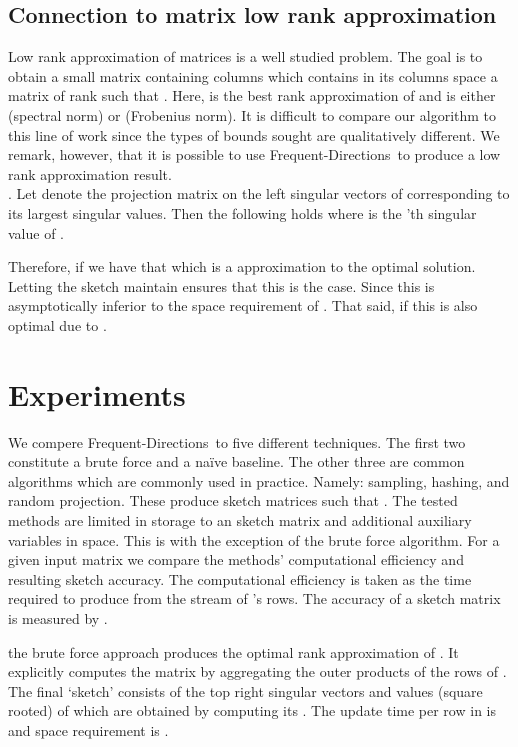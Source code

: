 \documentclass[]{article}
\newcommand{\FD}{Frequent-Directions}
\begin{document}
\subsection{Connection to matrix low rank approximation}
Low rank approximation of matrices is a well studied problem.
The goal is to obtain a small matrix  containing  columns 
which contains in its columns space a matrix  of rank  such that .
Here,  is the best rank  approximation of  and  is either  (spectral norm) or  (Frobenius norm). 
It is difficult to compare our algorithm to this line of work since the types of bounds sought are qualitatively different.
We remark, however, that it is possible to use \FD~to produce a low rank approximation result.\\
.
Let  denote the projection matrix on the left  singular vectors of  corresponding to its largest singular values.
Then the following holds  where  is the 'th
singular value of .

Therefore, if   we have that 
which is a  approximation to the optimal solution.
Letting the sketch  maintain  ensures that this is the case.
Since  this is asymptotically inferior to the space requirement of \cite{BoutsidisDrineasMagdon2011}. That said, if  this is also optimal due to \cite{ClarksonWoodruff2009}.  


\section{Experiments}\label{experiments}

We compere \FD~to five different techniques. 
The first two constitute a brute force and a na\"ive baseline. 
The other three are common algorithms which are commonly used in practice.
Namely: sampling, hashing, and random projection. 
These produce sketch matrices  such that . 
The tested methods are limited in storage to an  sketch matrix  and additional auxiliary variables in  space.
This is with the exception of the brute force algorithm.
For a given input matrix  we compare the methods' computational efficiency and resulting sketch accuracy.
The computational efficiency is taken as the time required to produce  from the stream of 's rows. 
The accuracy of a sketch matrix  is measured by .

 the brute force approach produces the optimal rank  approximation of .
It explicitly computes the matrix  by aggregating the outer products of the rows of . 
The final `sketch' consists of the top  right singular vectors and 
values (square rooted) of  which are obtained by computing its .
The update time per row in  is  and space requirement is .
\end{document}
